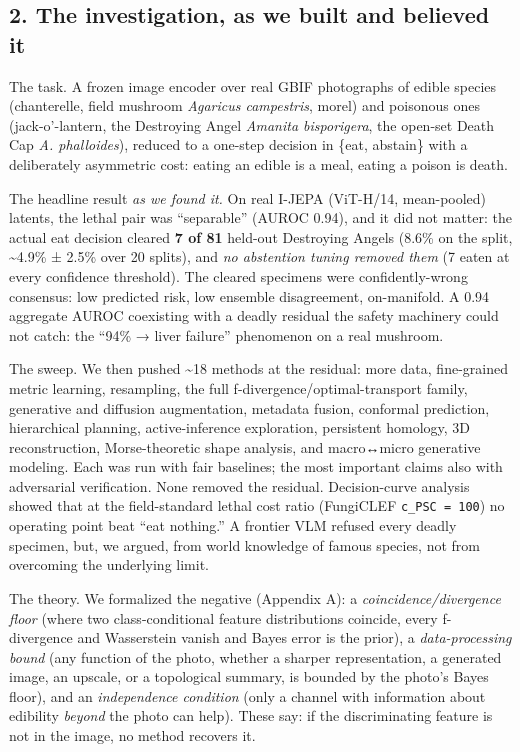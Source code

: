 \subsection{2. The investigation, as we built and believed
it}\label{the-investigation-as-we-built-and-believed-it}

The task. A frozen image encoder over real GBIF photographs of edible
species (chanterelle, field mushroom \emph{Agaricus campestris}, morel)
and poisonous ones (jack-o'-lantern, the Destroying Angel \emph{Amanita
bisporigera}, the open-set Death Cap \emph{A. phalloides}), reduced to a
one-step decision in \{eat, abstain\} with a deliberately asymmetric
cost: eating an edible is a meal, eating a poison is death.

The headline result \emph{as we found it.} On real I-JEPA (ViT-H/14,
mean-pooled) latents, the lethal pair was ``separable'' (AUROC 0.94),
and it did not matter: the actual eat decision cleared \textbf{7 of 81}
held-out Destroying Angels (8.6\% on the split, \textasciitilde4.9\% ±
2.5\% over 20 splits), and \emph{no abstention tuning removed them} (7
eaten at every confidence threshold). The cleared specimens were
confidently-wrong consensus: low predicted risk, low ensemble
disagreement, on-manifold. A 0.94 aggregate AUROC coexisting with a
deadly residual the safety machinery could not catch: the ``94\% → liver
failure'' phenomenon on a real mushroom.

The sweep. We then pushed \textasciitilde18 methods at the residual:
more data, fine-grained metric learning, resampling, the full
f-divergence/optimal-transport family, generative and diffusion
augmentation, metadata fusion, conformal prediction, hierarchical
planning, active-inference exploration, persistent homology, 3D
reconstruction, Morse-theoretic shape analysis, and macro↔micro
generative modeling. Each was run with fair baselines; the most
important claims also with adversarial verification. None removed the
residual. Decision-curve analysis showed that at the field-standard
lethal cost ratio (FungiCLEF \texttt{c\_PSC\ =\ 100}) no operating point
beat ``eat nothing.'' A frontier VLM refused every deadly specimen, but,
we argued, from world knowledge of famous species, not from overcoming
the underlying limit.

The theory. We formalized the negative (Appendix A): a
\emph{coincidence/divergence floor} (where two class-conditional feature
distributions coincide, every f-divergence and Wasserstein vanish and
Bayes error is the prior), a \emph{data-processing bound} (any function
of the photo, whether a sharper representation, a generated image, an
upscale, or a topological summary, is bounded by the photo's Bayes
floor), and an \emph{independence condition} (only a channel with
information about edibility \emph{beyond} the photo can help). These
say: if the discriminating feature is not in the image, no method
recovers it.

